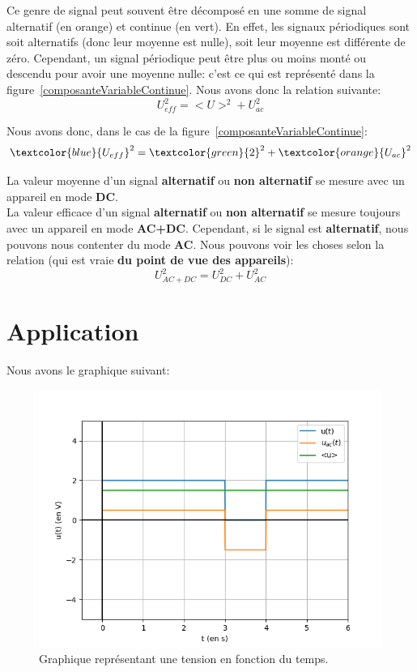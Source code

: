 \documentclass[12pt,a4paper,openany]{book}
\begin{document}
Ce genre de signal peut souvent être décomposé en une somme de signal alternatif (en orange) et continue (en vert). En effet, les signaux périodiques sont soit alternatifs (donc leur moyenne est nulle), soit leur moyenne est différente de zéro. Cependant, un signal périodique peut être plus ou moins monté ou descendu pour avoir une moyenne nulle: c'est ce qui est représenté dans la figure~\ref{composanteVariableContinue}. Nous avons donc la relation suivante:
\begin{equation}
U^{2}_{eff} = <U>^{2} + U^{2}_{ac}
\end{equation}

Nous avons donc, dans le cas de la figure~\ref{composanteVariableContinue}:
\begin{equation*}
\textcolor{blue}{U_{eff}}^{2} = \textcolor{green}{2}^{2} + \textcolor{orange}{U_{ac}}^{2}
\end{equation*}

La valeur moyenne d'un signal \textbf{alternatif} ou \textbf{non alternatif} se mesure avec un appareil en mode \textbf{DC}.\\
La valeur efficace d'un signal \textbf{alternatif} ou \textbf{non alternatif} se mesure toujours avec un appareil en mode \textbf{AC+DC}. Cependant, si le signal est \textbf{alternatif}, nous pouvons nous contenter du mode \textbf{AC}. Nous pouvons voir les choses selon la relation (qui est vraie \textbf{du point de vue des appareils}):
\begin{equation*}
U^{2}_{AC+DC} = U^{2}_{DC} + U^{2}_{AC}
\end{equation*}

\newpage

\section{Application}

Nous avons le graphique suivant:
\begin{figure}[!h]
\begin{center}
\includegraphics[scale=0.8]{Images/applicationChapitre2.png} 
\caption{Graphique représentant une tension en fonction du temps.}
\label{applicationChapitre2}
\end{center}
\end{figure}
\end{document}

